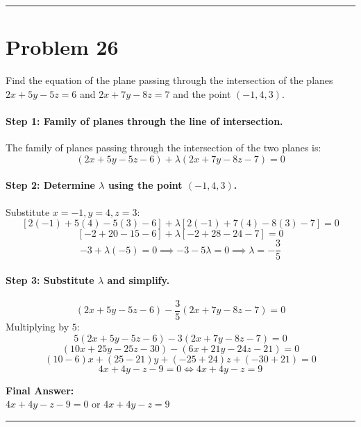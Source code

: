 \documentclass[11pt,a4paper]{article}
\begin{document}
\vspace{0.4cm}
\hrule
\vspace{0.4cm}

\section{Problem 26}
\begin{problembox}[Problem 26]
Find the equation of the plane passing through the intersection of the planes $2x + 5y - 5z = 6$ and $2x + 7y - 8z = 7$ and the point $(-1, 4, 3)$.
\end{problembox}

\paragraph{Step 1: Family of planes through the line of intersection.}
The family of planes passing through the intersection of the two planes is:
$$(2x + 5y - 5z - 6) + \lambda(2x + 7y - 8z - 7) = 0$$

\paragraph{Step 2: Determine $\lambda$ using the point $(-1, 4, 3)$.}
Substitute $x = -1, y = 4, z = 3$:
$$[2(-1) + 5(4) - 5(3) - 6] + \lambda[2(-1) + 7(4) - 8(3) - 7] = 0$$
$$[-2 + 20 - 15 - 6] + \lambda[-2 + 28 - 24 - 7] = 0$$
$$-3 + \lambda(-5) = 0 \implies -3 - 5\lambda = 0 \implies \lambda = -\frac{3}{5}$$

\paragraph{Step 3: Substitute $\lambda$ and simplify.}
$$(2x + 5y - 5z - 6) - \frac{3}{5}(2x + 7y - 8z - 7) = 0$$
Multiplying by $5$:
$$5(2x + 5y - 5z - 6) - 3(2x + 7y - 8z - 7) = 0$$
$$(10x + 25y - 25z - 30) - (6x + 21y - 24z - 21) = 0$$
$$(10 - 6)x + (25 - 21)y + (-25 + 24)z + (-30 + 21) = 0$$
$$4x + 4y - z - 9 = 0 \iff 4x + 4y - z = 9$$

\begin{resultbox}
\textbf{Final Answer:}\\
$\boxed{4x + 4y - z - 9 = 0}$ \quad or \quad $\boxed{4x + 4y - z = 9}$
\end{resultbox}

\vspace{0.4cm}
\hrule
\vspace{0.4cm}
\end{document}
